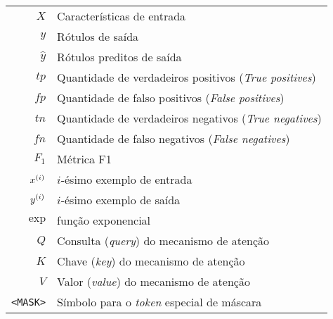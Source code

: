 \clearpage


\begin{tabular}{rl}
$X$ & Características de entrada\\
$y$ & Rótulos de saída\\
$\hat{y}$ & Rótulos preditos de saída\\
$tp$ & Quantidade de verdadeiros positivos (\emph{True positives})\\
$fp$ & Quantidade de falso positivos (\emph{False positives})\\
$tn$ & Quantidade de verdadeiros negativos (\emph{True negatives})\\
$fn$ & Quantidade de falso negativos (\emph{False negatives})\\
$F_1$ & Métrica F1\\
$\xii[x]{i}$ & $i$-ésimo exemplo de entrada\\
$\xii[y]{i}$ & $i$-ésimo exemplo de saída\\
$\text{exp}$ & função exponencial\\
$Q$ & Consulta (\emph{query}) do mecanismo de atenção\\
$K$ & Chave (\emph{key}) do mecanismo de atenção\\
$V$ & Valor (\emph{value}) do mecanismo de atenção\\
\texttt{<MASK>} & Símbolo para o \textit{token} especial de máscara\\
\end{tabular}

\clearpage


\disablenewpage{\listoffigures}

\disablenewpage{\listoftables}

\tableofcontents

\egroup %

